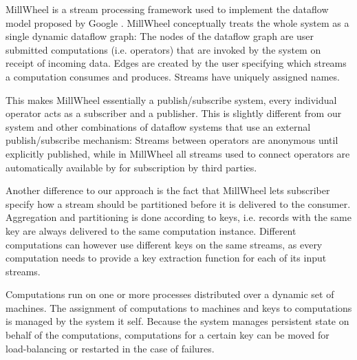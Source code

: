 MillWheel \cite{millwheel} is a stream processing framework used to implement
the dataflow model proposed by Google \cite{google}. MillWheel conceptually
treats the whole system as a single dynamic dataflow graph: The nodes of the
dataflow graph are user submitted computations (i.e. operators) that are
invoked by the system on receipt of incoming data. Edges are created by the
user specifying which streams a computation consumes and produces. Streams
have uniquely assigned names.

This makes MillWheel essentially a publish/subscribe system, every individual
operator acts as a subscriber and a publisher. This is slightly different from
our system and other combinations of dataflow systems that use an external
publish/subscribe mechanism: Streams between operators are anonymous until
explicitly published, while in MillWheel all streams used to connect operators
are automatically available by for subscription by third parties.

Another difference to our approach is the fact that MillWheel lets subscriber
specify how a stream should be partitioned before it is delivered to the consumer.
Aggregation and partitioning is done according to keys, i.e. records with the
same key are always delivered to the same computation instance. Different
computations can however use different keys on the same streams, as every computation
needs to provide a key extraction function for each of its input streams.

Computations run on one or more processes distributed over a dynamic set of
machines. The assignment of computations to machines and keys to computations
is managed by the system it self. Because the system manages persistent state
on behalf of the computations, computations for a certain key can be moved
for load-balancing or restarted in the case of failures.

